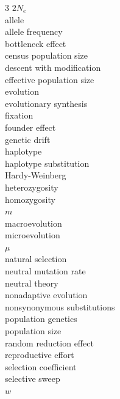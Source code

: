 
\begin{multicols}{3}
$2N_e$\\
allele\\
allele frequency\\
bottleneck effect\\
census population size\\
descent with modification\\
effective population size\\
evolution\\
evolutionary synthesis\\
fixation\\
founder effect\\
genetic drift\\
haplotype\\
haplotype substitution\\
Hardy-Weinberg\\
heterozygosity\\
homozygosity\\
$m$\\
macroevolution\\
microevolution\\
$\mu$\\
natural selection\\
neutral mutation rate\\
neutral theory\\
nonadaptive evolution\\
nonsynonymous substitutions\\
population genetics\\
population size\\
random reduction effect\\ 
reproductive effort\\
selection coefficient\\
selective sweep\\
$w$
\end{multicols}
